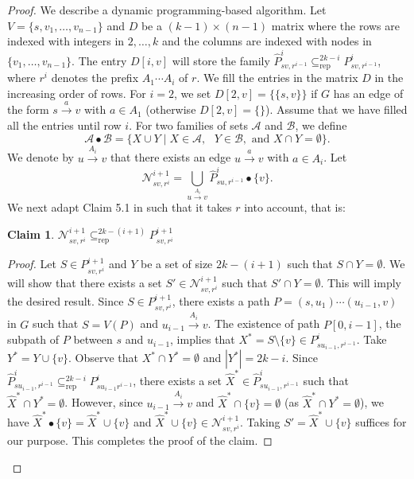 \documentclass[a4paper,english]{lipics-v2016}
\theoremstyle{plain}
\newtheorem{claim}[theorem]{Claim}
\begin{document}
\begin{proof}

  We describe a dynamic programming-based algorithm. Let $V =
  \{s,v_1,\ldots,v_{n-1}\}$ and $D$ be a $(k-1)\times (n-1)$ matrix
  where the rows are indexed with integers in ${2,\ldots, k}$ and the
  columns are indexed with nodes in $\{v_1, \ldots ,
  v_{n-1}\}$. The entry $D[i, v]$ will store the family
  $\hat{P}^i_{sv,r^{i-1}} \subseteq^{2k-i}_\text{rep} P^i_{sv,r^{i-1}}$,
  where $r^i$ denotes the prefix $A_1 \cdots A_i$ of $r$. We fill the
  entries in the matrix $D$ in the increasing order of rows.  For $i =
  2$, we set $D[2,v] = \{\{s,v\}\}$ if $G$ has an edge of the form $s
  \stackrel{a}{\to} v$ with $a \in A_1$ (otherwise $D[2,v] = \{\}$). 
  Assume that we have filled
  all the entries until row
  $i$. 
 For two families of
sets $\mathcal{A}$ and $\mathcal{B}$, we define $$\mathcal{A} \bullet
\mathcal{B} = \{ X \cup Y \mid X \in \mathcal{A},\text{ }Y \in \mathcal{B},
\text{ and } X \cap Y = \emptyset\}.$$  
  We denote by $u \stackrel{A_i}{\to} v$ that
  there exists an edge $u \stackrel{a}{\to} v$ with $a \in A_i$. 
   Let $$\mathcal{N}^{i+1}_{sv,r^i}=\bigcup_{u\stackrel{A_i}{\to}
    v} \hat{P}^i_{su,r^{i-1}} \bullet \{v\}.$$
We next adapt Claim 5.1 in \cite{fomin} such that it takes $r$ into account, that is:
\begin{claim}
\label{Fomin5.1}
$\mathcal{N}^{i+1}_{sv,r^i}\subseteq^{2k-(i+1)}_\text{rep} P^{i+1}_{sv,r^i}$
\end{claim}
\begin{proof}
Let $S \in P^{i+1}_{sv,r^i}$ and $Y$ be a set of size $2k-(i+1)$ such that $S \cap Y = \emptyset$. We will show that there exists a set $S' \in \mathcal{N}^{i+1}_{sv,r^i}$ such that $S' \cap Y = \emptyset$. This will imply the desired result. Since $S \in P^{i+1}_{sv,r^i}$,
there exists a path $P = (s,u_1)\cdots (u_{i-1},v)$ in $G$ such that
$S = V(P)$ and $u_{i-1} \stackrel{A_{i}}{\to} v$. 
The existence of path $P[0, i-1]$, the subpath of $P$ between $s$ and $u_{i-1}$, implies that $X^* = S\setminus\{v\} \in P^{i}_{su_{i-1},r^{i-1}}$. Take $Y^* = Y \cup \{v\}$. Observe that $X^*\cap Y^* = \emptyset$ and $|Y^*|=2k-i$. Since $\hat{P}^i_{su_{i-1},r^{i-1}} \subseteq^{2k-i}_\text{rep} P^i_{su_{i-1}r^{i-1}}$, there exists a set $\hat{X}^* \in \hat{P}^i_{su_{i-1},r^{i-1}}$ such that $\hat{X}^*\cap Y^* = \emptyset$.
However, since $u_{i-1}\stackrel{A_i}{\to} v$ and $\hat{X}^*\cap \{v\} = \emptyset$ (as $\hat{X}^*\cap Y^* = \emptyset$), we have $\hat{X}^*\bullet \{v\} = \hat{X}^*\cup \{v\}$ and $\hat{X}^*\cup \{v\} \in \mathcal{N}^{i+1}_{sv,r^i}$. Taking $S' = \hat{X}^*\cup\{v\}$ suffices for our purpose. This completes the
proof of the claim.
\end{proof}


\end{proof}
\end{document}
